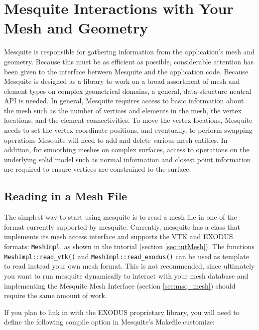 \chapter{Mesquite Interactions with Your Mesh and Geometry}
\label{sec:meshes}

Mesquite is responsible for gathering information from the
application's mesh and geometry.  Because this must be as efficient as
possible, considerable attention has been given to the interface
between Mesquite and the application code.  Because Mesquite is
designed as a library to work on a broad assortment of mesh and
element types on complex geometrical domains, a general,
data-structure neutral API is needed.  In general, Mesquite requires
access to basic information about the mesh such as the number of
vertices and elements in the mesh, the vertex locations, and the
element connectivities.  To move the vertex locations, Mesquite needs
to set the vertex coordinate positions, and eventually, to perform
swapping operations Mesquite will need to add and delete various mesh
entities.  In addition, for smoothing meshes on complex surfaces,
access to operations on the underlying solid model such as normal
information and closest point information are required to ensure
vertices are constrained to the surface.

\section{Reading in a Mesh File} \label{sec:meshFiles}

The simplest way to start using mesquite is to read a mesh file in one of the format currently
supported by mesquite. Currently, mesquite has a class that implements its mesh access interface and
supports the VTK \cite{VTKbook, VTKuml} and EXODUS formats: \texttt{MeshImpl}, as shown in the tutorial (section
\ref{sec:tutMesh}). The functions \texttt{MeshImpl::read\_vtk()}
and \texttt{MeshImpl::read\_exodus()} can be used as template to read instead your own mesh format. This is not
recommended, since ultimately you want to run mesquite dynamically to interact with your mesh
database and implementing the Mesquite Mesh Interface (section \ref{sec:msq_mesh}) should require the same amount of work. 

If you plan to link in with the EXODUS proprietary library, you will need to define the following
compile option in Mesquite's Makefile.customize: 

